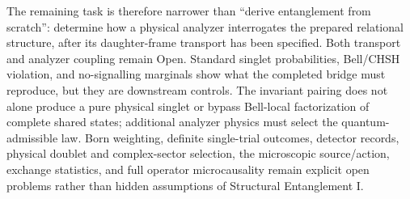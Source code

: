 \documentclass[11pt]{article}
\theoremstyle{remark}
\begin{document}
The remaining task is therefore narrower than ``derive entanglement from scratch'': determine how a
physical analyzer interrogates the prepared relational structure, after its daughter-frame
transport has been specified.  Both transport and analyzer coupling remain Open.
Standard singlet probabilities, Bell/CHSH violation, and no-signalling marginals show what the
completed bridge must reproduce, but they are downstream controls.  The
invariant pairing does not alone produce a pure physical singlet or bypass
Bell-local factorization of complete shared states; additional analyzer
physics must select the quantum-admissible law.  Born weighting, definite
single-trial outcomes, detector records, physical doublet and complex-sector selection, the
microscopic source/action, exchange statistics, and full operator microcausality remain explicit
open problems rather than hidden assumptions of Structural Entanglement I.



\newpage
\printbibliography
\end{document}
